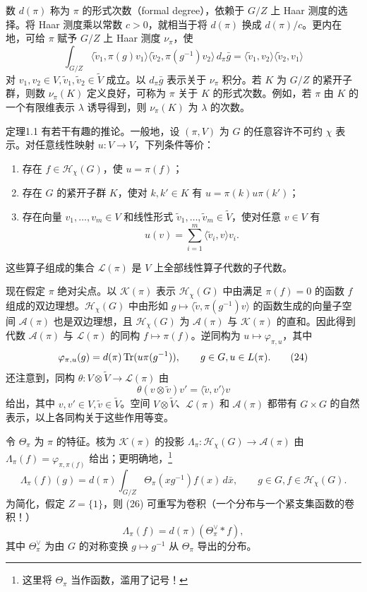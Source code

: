 数 $d(\pi)$ 称为 $\pi$ 的形式次数（formal degree），依赖于 $G/Z$ 上 Haar 测度的选择。将 Haar 测度乘以常数 $c>0$，就相当于将 $d(\pi)$ 换成 $d(\pi)/c$。更内在地，可给 $\pi$ 赋予 $G/Z$ 上 Haar 测度 $\nu_\pi$，使
\[
\int_{G/Z}\langle\widetilde v_1,\pi(g)v_1\rangle\langle\widetilde v_2,\pi(g^{-1})v_2\rangle\,d_\pi\bar g
=\langle\widetilde v_1,v_2\rangle\langle\widetilde v_2,v_1\rangle\tag{22}
\]
对 $v_1,v_2\in V,\widetilde v_1,\widetilde v_2\in\widetilde V$ 成立。以 $d_\pi\bar g$ 表示关于 $\nu_\pi$ 积分。若 $K$ 为 $G/Z$ 的紧开子群，则数 $\nu_\pi(K)$ 定义良好，可称为 $\pi$ 关于 $K$ 的形式次数。例如，若 $\pi$ 由 $K$ 的一个有限维表示 $\lambda$ 诱导得到，则 $\nu_\pi(K)$ 为 $\lambda$ 的次数。

定理1.1 有若干有趣的推论。一般地，设 $(\pi,V)$ 为 $G$ 的任意容许不可约 $\chi$ 表示。对任意线性映射 $u:V\to V$，下列条件等价：
\begin{enumerate}
\item[(a)] 存在 $f\in\mathcal H_\chi(G)$，使 $u=\pi(f)$；
\item[(b)] 存在 $G$ 的紧开子群 $K$，使对 $k,k'\in K$ 有 $u=\pi(k)u\pi(k')$；
\item[(c)] 存在向量 $v_1,\ldots,v_m\in V$ 和线性形式 $\widetilde v_1,\ldots,\widetilde v_m\in\widetilde V$，使对任意 $v\in V$ 有
\[
u(v)=\sum_{i=1}^m\langle\widetilde v_i,v\rangle v_i.\tag{23}
\]
\end{enumerate}
这些算子组成的集合 $\mathcal L(\pi)$ 是 $V$ 上全部线性算子代数的子代数。

现在假定 $\pi$ 绝对尖点。以 $\mathcal K(\pi)$ 表示 $\mathcal H_\chi(G)$ 中由满足 $\pi(f)=0$ 的函数 $f$ 组成的双边理想。$\mathcal H_\chi(G)$ 中由形如 $g\mapsto\langle\widetilde v,\pi(g^{-1})v\rangle$ 的函数生成的向量子空间 $\mathcal A(\pi)$ 也是双边理想，且 $\mathcal H_\chi(G)$ 为 $\mathcal A(\pi)$ 与 $\mathcal K(\pi)$ 的直和。因此得到代数 $\mathcal A(\pi)$ 与 $\mathcal L(\pi)$ 的同构 $f\mapsto\pi(f)$。逆同构为 $u\mapsto\varphi_{\pi,u}$，其中
\[
\varphi_{\pi,u}(g)=d(\pi)\operatorname{Tr}(u\pi(g^{-1})),\qquad g\in G,u\in L(\pi).\tag{24}
\]
还注意到，同构 $\theta:V\otimes\widetilde V\to\mathcal L(\pi)$ 由
\[
\theta(v\otimes\widetilde v)v'=\langle\widetilde v,v'\rangle v\tag{25}
\]
给出，其中 $v,v'\in V,\widetilde v\in\widetilde V$。空间 $V\otimes\widetilde V$、$\mathcal L(\pi)$ 和 $\mathcal A(\pi)$ 都带有 $G\times G$ 的自然表示，以上各同构关于这些作用等变。

令 $\Theta_\pi$ 为 $\pi$ 的特征。核为 $\mathcal K(\pi)$ 的投影 $\Lambda_\pi:\mathcal H_\chi(G)\to\mathcal A(\pi)$ 由 $\Lambda_\pi(f)=\varphi_{\pi,\pi(f)}$ 给出；更明确地，\footnote{这里将 $\Theta_\pi$ 当作函数，滥用了记号！}
\[
\Lambda_\pi(f)(g)=d(\pi)\int_{G/Z}\Theta_\pi(xg^{-1})f(x)\,d\bar x,\qquad g\in G,f\in\mathcal H_\chi(G).\tag{26}
\]
为简化，假定 $Z=\{1\}$，则 (26) 可重写为卷积（一个分布与一个紧支集函数的卷积！）
\[
\Lambda_\pi(f)=d(\pi)(\Theta_\pi^\vee*f),\tag{27}
\]
其中 $\Theta_\pi^\vee$ 为由 $G$ 的对称变换 $g\mapsto g^{-1}$ 从 $\Theta_\pi$ 导出的分布。

